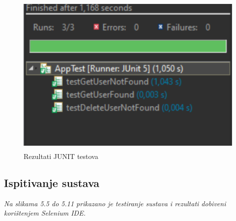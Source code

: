 			\newpage
			\begin{figure}[H]
				\centering
				\includegraphics[width=\textwidth,height=8cm]{slike/slike_testova/JUNIT/results.PNG}
				\caption{Rezultati JUNIT testova}
				\label{fig:my_label}
			\end{figure}
			
			\subsection{Ispitivanje sustava}
			
			 \textit{Na slikama 5.5 do 5.11 prikazano je testiranje sustava i rezultati dobiveni korištenjem Selenium IDE. }
			 
